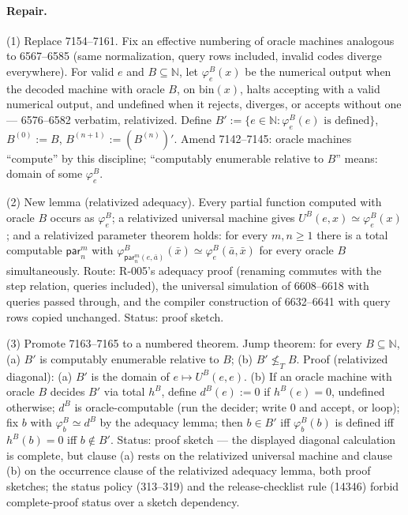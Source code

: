 \paragraph{Repair.} (1) Replace 7154--7161.  Fix an effective numbering of oracle machines analogous to 6567--6585 (same normalization, query rows included, invalid codes diverge everywhere).  For valid \(e\) and \(B\subseteq\mathbb N\), let \(\varphi^B_e(x)\) be the numerical output when the decoded machine with oracle \(B\), on \(\mathrm{bin}(x)\), halts accepting with a valid numerical output, and undefined when it rejects, diverges, or accepts without one --- 6576--6582 verbatim, relativized.  Define \(B':=\{e\in\mathbb N:\varphi^B_e(e)\text{ is defined}\}\), \(B^{(0)}:=B\), \(B^{(n+1)}:=(B^{(n)})'\).  Amend 7142--7145: oracle machines ``compute'' by this discipline; ``computably enumerable relative to \(B\)'' means: domain of some \(\varphi^B_e\).

(2) New lemma (relativized adequacy).  Every partial function computed with oracle \(B\) occurs as \(\varphi^B_e\); a relativized universal machine gives \(U^B(e,x)\simeq\varphi^B_e(x)\); and a relativized parameter theorem holds: for every \(m,n\geq1\) there is a total computable \(\mathsf{par}_n^m\) with \(\varphi^B_{\mathsf{par}_n^m(e,\bar a)}(\bar x)\simeq\varphi^B_e(\bar a,\bar x)\) for every oracle \(B\) simultaneously.  Route: R-005's adequacy proof (renaming commutes with the step relation, queries included), the universal simulation of 6608--6618 with queries passed through, and the compiler construction of 6632--6641 with query rows copied unchanged.  Status: proof sketch.

(3) Promote 7163--7165 to a numbered theorem.  Jump theorem: for every \(B\subseteq\mathbb N\), (a) \(B'\) is computably enumerable relative to \(B\); (b) \(B'\not\leq_T B\).  Proof (relativized diagonal): (a) \(B'\) is the domain of \(e\mapsto U^B(e,e)\).  (b) If an oracle machine with oracle \(B\) decides \(B'\) via total \(h^B\), define \(d^B(e):=0\) if \(h^B(e)=0\), undefined otherwise; \(d^B\) is oracle-computable (run the decider; write \(0\) and accept, or loop); fix \(b\) with \(\varphi^B_b\simeq d^B\) by the adequacy lemma; then \(b\in B'\) iff \(\varphi^B_b(b)\) is defined iff \(h^B(b)=0\) iff \(b\notin B'\).  Status: proof sketch --- the displayed diagonal calculation is complete, but clause (a) rests on the relativized universal machine and clause (b) on the occurrence clause of the relativized adequacy lemma, both proof sketches; the status policy (313--319) and the release-checklist rule (14346) forbid complete-proof status over a sketch dependency.

